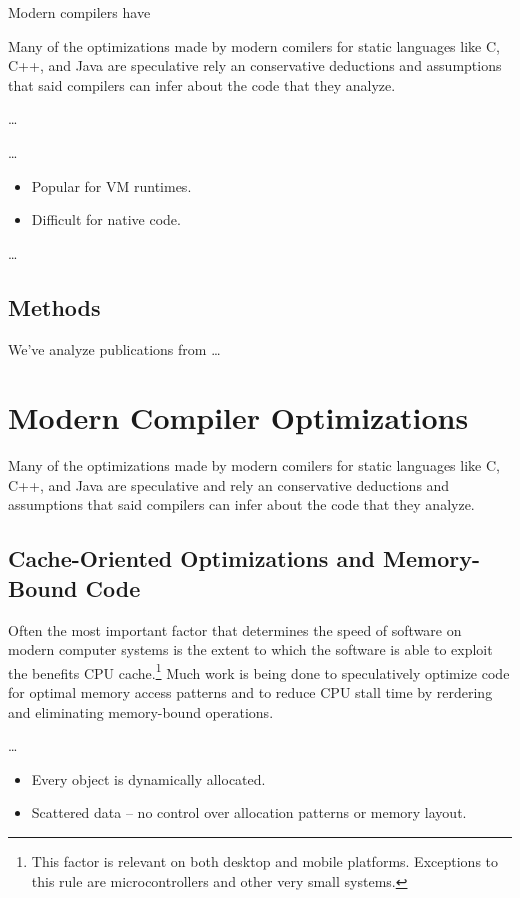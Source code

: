 \documentclass[nobib]{tufte-handout}
\newcommand{\placeholdertext}[1]{
	\noindent{\color{red}{#1}}
}
\begin{document}
Modern compilers have 

Many of the optimizations made by modern comilers for static languages like C, C++, and Java are speculative rely an conservative deductions and assumptions that said compilers can infer about the code that they analyze.  


\placeholdertext{C programmers' expectations about code generation} \ldots

\placeholdertext{JIT compilation} \ldots
\begin{itemize}
\item Popular for VM runtimes.
\item Difficult for native code.
\end{itemize}


\placeholdertext{Cache latency is one of the largest factors in program speed} \ldots



\subsection{Methods}
We've analyze publications from \placeholdertext{LIST OF CONFERENCES} \ldots


\section{Modern Compiler Optimizations}
Many of the optimizations made by modern comilers for static languages like C, C++, and Java are speculative and rely an conservative deductions and assumptions that said compilers can infer about the code that they analyze.  

\subsection{Cache-Oriented Optimizations and Memory-Bound Code}
Often the most important factor that determines the speed of software on modern computer systems is the extent to which the software is able to exploit the benefits CPU cache.\footnote{This factor is relevant on both desktop and mobile platforms.  Exceptions to this rule are microcontrollers and other very small systems.}  Much work is being done to speculatively optimize code for optimal memory access patterns and to reduce CPU stall time by rerdering and eliminating memory-bound operations.

\placeholdertext{Languages with reference semantics (Java, C\#, Python) suffer poor cache performance because of their implicit object model.} \ldots \newline
\begin{itemize}
	\item Every object is dynamically allocated. 
	\item Scattered data -- no control over allocation patterns or memory layout.
\end{itemize}
\end{document}
